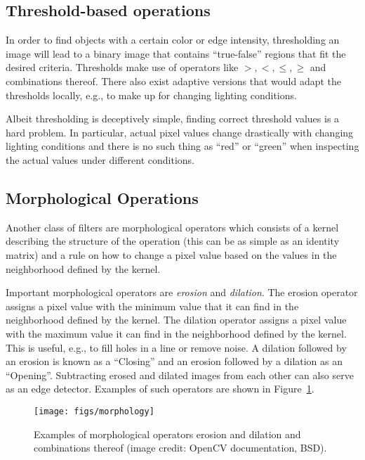 \subsection{Threshold-based operations}
In order to find objects with a certain color or edge intensity, thresholding an image will lead to a binary image that contains ``true-false'' regions that fit the desired criteria. Thresholds make use of operators like $>,<,\leq,\geq$ and combinations thereof. There also exist adaptive versions that would adapt the thresholds locally, e.g., to make up for changing lighting conditions.

Albeit thresholding is deceptively simple, finding correct threshold values is a hard problem. In particular, actual pixel values change drastically with changing lighting conditions and there is no such thing as ``red'' or ``green'' when inspecting the actual values under different conditions.

\subsection{Morphological Operations}
Another class of filters are morphological operators which consists of a kernel describing the structure of the operation (this can be as simple as an identity matrix) and a rule on how to change a pixel value based on the values in the neighborhood defined by the kernel.

Important morphological operators are \emph{erosion} and \emph{dilation}. The erosion operator assigns a pixel value with the minimum value that it can find in the neighborhood defined by the kernel. The dilation operator assigns a pixel value with the maximum value it can find in the neighborhood defined by the kernel. This is useful, e.g., to fill holes in a line or remove noise. A dilation followed by an erosion is known as a ``Closing'' and an erosion followed by a dilation as an ``Opening''. Subtracting erosed and dilated images from each other can also serve as an edge detector. Examples of such operators are shown in Figure~\ref{fig:morphology}.

\begin{figure}
    \centering
    \texttt{[image: figs/morphology]}
    \caption{Examples of morphological operators erosion and dilation and combinations thereof (image credit: OpenCV documentation, BSD).
    \label{fig:morphology}}
\end{figure}


